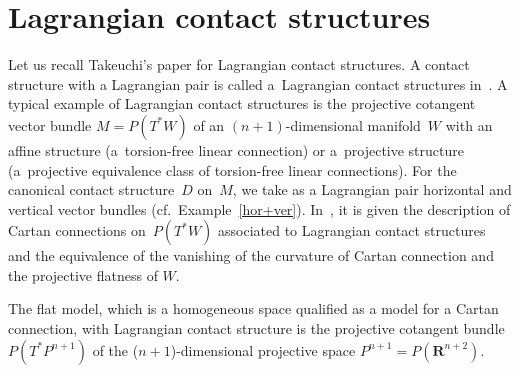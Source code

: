 \documentclass[pdftex]{sigma}
\begin{document}
\section{Lagrangian contact structures}
\label{Lagrangian contact structures.}

Let us recall Takeuchi's paper \cite{Tak} for Lagrangian contact structures.
A contact structure with a Lagrangian pair is called a~Lagrangian contact structures in~\cite{Tak}.
A typical example of Lagrangian contact structures
is the projective cotangent vector bundle
$M = P(T^*W)$ of an $(n+1)$-dimensional manifold~$W$
with an af\/f\/ine structure (a~torsion-free linear connection) or
a~projective structure
(a~projective equivalence class of torsion-free linear connections).
For the canonical contact structure~$D$ on~$M$,
we take as a Lagrangian pair horizontal and vertical vector bundles
(cf.\ Example~\ref{hor+ver}).
In~\cite{Tak}, it is given the description of Cartan connections on~$P(T^*W)$
associated to Lagrangian contact structures and the equivalence of the vanishing
of the curvature of Cartan connection and the projective f\/latness of $W$.

The f\/lat model, which is a homogeneous space qualif\/ied as a model
for a Cartan connection, with Lagrangian contact structure is
the projective cotangent bundle $P(T^*P^{n+1})$
of the ($n+1$)-dimensional projective space $P^{n+1}=P(\mathbf{R}^{n+2})$.
\end{document}
